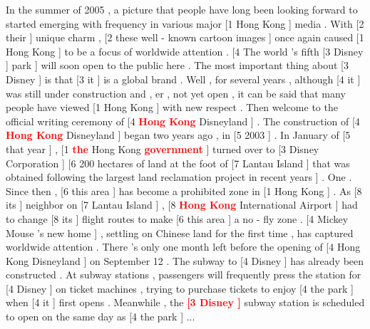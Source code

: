 \documentclass[11pt,a4paper]{article}
\begin{document}
\begin{figure*}[ht!]
In the summer of 2005 , a picture that people have long been looking forward to started emerging with frequency in various major [1 Hong Kong ] media . With [2 their ] unique charm , [2 these well - known cartoon images ] once again caused [1 Hong Kong ] to be a focus of worldwide attention . [4 The world 's fifth [3 Disney ] park ] will soon open to the public here . The most important thing about [3 Disney ] is that [3 it ] is a global brand . Well , for several years , although [4 it ] was still under construction and , er , not yet open , it can be said that many people have viewed [1 Hong Kong ] with new respect . Then welcome to the official writing ceremony of [4 \textcolor{red}{\bf Hong Kong} Disneyland ] . The construction of [4 \textcolor{red}{\bf Hong Kong} Disneyland ] began two years ago , in [5 2003 ] . In January of [5 that year ] , [1 \textcolor{red}{\bf the} Hong Kong \textcolor{red}{\bf government} ] turned over to [3 Disney Corporation ] [6 200 hectares of land at the foot of [7 Lantau Island ] that was obtained following the largest land reclamation project in recent years ] . One . Since then , [6 this area ] has become a prohibited zone in [1 Hong Kong ] . As [8 its ] neighbor on [7 Lantau Island ] , [8 \textcolor{red}{\bf Hong Kong} International Airport ] had to change [8 its ] flight routes to make [6 this area ] a no - fly zone . [4 Mickey Mouse 's new home ] , settling on Chinese land for the first time , has captured worldwide attention . There 's only one month left before the opening of [4 Hong Kong Disneyland ] on September 12 . The subway to [4 Disney ] has already been constructed . At subway stations , passengers will frequently press the station for [4 Disney ] on ticket machines , trying to purchase tickets to enjoy [4 the park ] when [4 it ] first opens .  Meanwhile , the \textcolor{red}{\bf [3 Disney ]} subway station is scheduled to open on the same day as [4 the park ] ...

\caption{Mistakes picked from CoNLL-2012 development set, e.g. {\em Hong Kong} should have been identified recursively within {\em Hong Kong Disneyland}; in the last sentence, {\em [3 Disney]} refers to {\em [3 Disney Corporation]} cluster instead correctly to {\em [4 The  world ’s fifth Disney park]} cluster. 
\label{fig:english-example}
}

~\\


\end{figure*}
\end{document}
